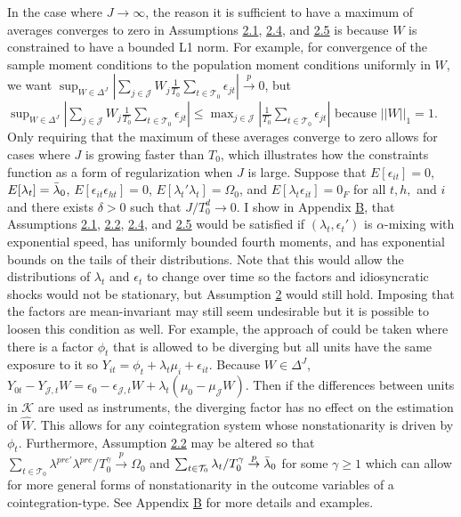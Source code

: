 \documentclass{article}
\begin{document}
In the case where $J \rightarrow \infty$, the reason it is sufficient to have a maximum of averages converges to zero in Assumptions \hyperlink{A2}{2.1}, \hyperref[A2]{2.4}, and \hyperref[A2]{2.5} is because $W$ is constrained to have a bounded L1 norm. For example, for convergence of the sample moment conditions to the population moment conditions uniformly in $W$, we want $\sup_{W \in \Delta^J} |\sum_{j \in \mathcal{J}} W_j \frac{1}{T_0} \sum_{t \in \mathcal{T}_0} \epsilon_{jt}| \overset{p}{\rightarrow} 0$, but $\sup_{W \in \Delta^J} |\sum_{j \in \mathcal{J}} W_j \frac{1}{T_0} \sum_{t \in \mathcal{T}_0} \epsilon_{jt}| \leq \max_{j \in \mathcal{J}} | \frac{1}{T_0} \sum_{t \in \mathcal{T}_0} \epsilon_{jt}|$ because $||W||_1 = 1$. Only requiring that the maximum of these averages converge to zero allows for cases where $J$ is growing faster than $T_0$, which illustrates how the constraints function as a form of regularization when $J$ is large. Suppose that $E[\epsilon_{it}] = 0$, $E[\lambda_t] = \Bar{\lambda}_0$, $E[\epsilon_{it}\epsilon_{ht}] = 0$, $E[\lambda_t'\lambda_t] = \Omega_0$, and $E[\lambda_t \epsilon_{it}] = 0_F$ for all $t,h,$ and $i$ and there exists $\delta > 0$ such that $J/T_0^d \rightarrow 0$. I show in Appendix \hyperref[ApB]{B}, that Assumptions \hyperref[A2]{2.1}, \hyperref[A2]{2.2}, \hyperref[A2]{2.4}, and \hyperref[A2]{2.5} would be satisfied if $(\lambda_t, \epsilon_t ')$ is $\alpha$-mixing with exponential speed, has uniformly bounded fourth moments, and has exponential bounds on the tails of their distributions. Note that this would allow the distributions of $\lambda_t$ and $\epsilon_t$ to change over time so the factors and idiosyncratic shocks would not be stationary, but Assumption \hyperref[A2]{2} would still hold. Imposing that the factors are mean-invariant may still seem undesirable but it is possible to loosen this condition as well. For example, the approach of \cite{t-test2022} could be taken where there is a factor $\phi_t$ that is allowed to be diverging but all units have the same exposure to it so $Y_{it} = \phi_t + \lambda_t \mu_i + \epsilon_{it}$. Because $W \in \Delta^J$, $Y_{0t} - Y_{\mathcal{J},t}W = \epsilon_0 - \epsilon_{\mathcal{J},t}W + \lambda_t(\mu_0 - \mu_{\mathcal{J}}W)$. Then if the differences between units in $\mathcal{K}$ are used as instruments, the diverging factor has no effect on the estimation of $\hat{W}$. This allows for any cointegration system whose nonstationarity is driven by $\phi_t$. Furthermore, Assumption \hyperref[A2]{2.2} may be altered so that $\sum_{t \in \mathcal{T}_0} \lambda^{pre'}\lambda^{pre}/T_0^\gamma \overset{p}{\rightarrow} \Omega_0$ and $\sum_{t \in \mathcal{T}_0} \lambda_t /T_0^\gamma \overset{p}{\rightarrow} \Bar{\lambda}_0$ for some $\gamma \geq 1$ which can allow for more general forms of nonstationarity in the outcome variables of a cointegration-type. See Appendix \hyperref[ApB]{B} for more details and examples.
\end{document}
